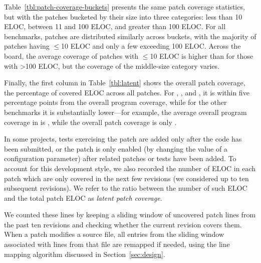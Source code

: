 Table~\ref{tbl:patch-coverage-buckets} presents the same patch
coverage statistics, but with the patches bucketed by their size into
three categories: less than 10 ELOC, between 11 and 100 ELOC, and
greater than 100 ELOC.  For all benchmarks, patches are distributed
similarly across buckets, with the majority of patches having $\le$10
ELOC and only a few exceeding 100 ELOC.  Across the board, the average
coverage of patches with $\le$10 ELOC is higher than for those with
\textgreater100 ELOC, but the coverage of the middle-size category varies.

Finally, the first column in Table~\ref{tbl:latent} shows the overall
patch coverage, \ie the percentage of covered ELOC across all
patches.  For \beanstalkd, \binutils, \git and \memcached, it is within five
percentage points from the overall program coverage, while for the
other benchmarks it is substantially lower---for example, the average
overall program coverage in \redis is \redisCoverageAverage, while the
overall patch coverage is only \redisOverallPatchCoverage.




In some projects, tests exercising the patch are added only after the
code has been submitted, or the patch is only enabled (\eg by changing
the value of a configuration parameter) after related patches or tests
have been added.  To account for this development style, we also
recorded the number of ELOC in each patch which are only covered in
the next few revisions (we considered up to ten subsequent revisions).
We refer to the ratio between the number of such ELOC and the total
patch ELOC as \textit{latent patch coverage}.

We counted these lines by keeping a sliding window of uncovered
patch lines from the past ten revisions and checking whether the
current revision covers them.  When a patch modifies a
source file, all entries from the sliding window associated with lines
from that file are remapped if needed, using the line mapping algorithm
discussed in Section~\ref{sec:design}.

